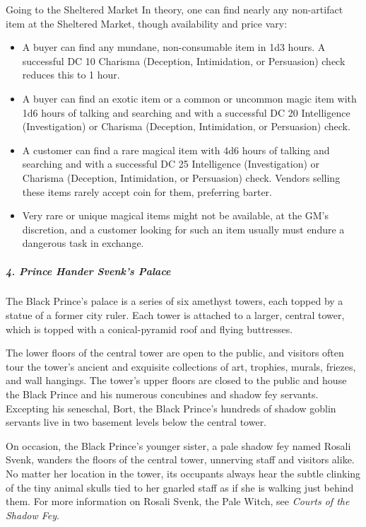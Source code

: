 \documentclass[10pt,a4paper,twoside,bg=print,twocolumn,openany,nodeprecatedcode]{dndbook}
\begin{document}
\begin{DndSidebar}[float=!b]{Going to the Sheltered Market}
In theory, one can find nearly any non-artifact item at the Sheltered Market, though availability and price vary:




\begin{itemize}
\item A buyer can find any mundane, non-consumable item in 1d3 hours. A successful DC 10 Charisma (Deception, Intimidation, or Persuasion) check reduces this to 1 hour.
\item A buyer can find an exotic item or a common or uncommon magic item with 1d6 hours of talking and searching and with a successful DC 20 Intelligence (Investigation) or Charisma (Deception, Intimidation, or Persuasion) check.
\item A customer can find a rare magical item with 4d6 hours of talking and searching and with a successful DC 25 Intelligence (Investigation) or Charisma (Deception, Intimidation, or Persuasion) check. Vendors selling these items rarely accept coin for them, preferring barter.
\item Very rare or unique magical items might not be available, at the GM's discretion, and a customer looking for such an item usually must endure a dangerous task in exchange.
\end{itemize}



\end{DndSidebar}

\subparagraph{4. Prince Hander Svenk's Palace}
The Black Prince's palace is a series of six amethyst towers, each topped by a statue of a former city ruler. Each tower is attached to a larger, central tower, which is topped with a conical-pyramid roof and flying buttresses.

The lower floors of the central tower are open to the public, and visitors often tour the tower's ancient and exquisite collections of art, trophies, murals, friezes, and wall hangings. The tower's upper floors are closed to the public and house the Black Prince and his numerous concubines and shadow fey servants. Excepting his seneschal, Bort, the Black Prince's hundreds of shadow goblin servants live in two basement levels below the central tower.

On occasion, the Black Prince's younger sister, a pale shadow fey named Rosali Svenk, wanders the floors of the central tower, unnerving staff and visitors alike. No matter her location in the tower, its occupants always hear the subtle clinking of the tiny animal skulls tied to her gnarled staff as if she is walking just behind them. For more information on Rosali Svenk, the Pale Witch, see \textit{Courts of the Shadow Fey}.
\end{document}
